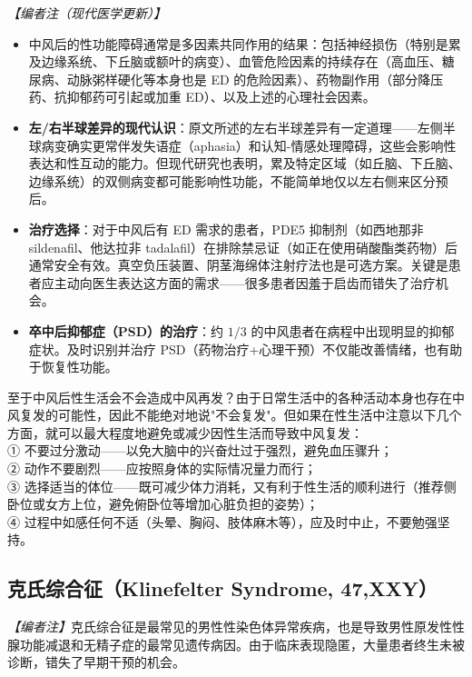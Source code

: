\noindent\textit{【编者注（现代医学更新）】}
\begin{itemize}
	\item 中风后的性功能障碍通常是多因素共同作用的结果：包括神经损伤（特别是累及边缘系统、下丘脑或额叶的病变）、血管危险因素的持续存在（高血压、糖尿病、动脉粥样硬化等本身也是 ED 的危险因素）、药物副作用（部分降压药、抗抑郁药可引起或加重 ED）、以及上述的心理社会因素。
	\item \textbf{左/右半球差异的现代认识}：原文所述的左右半球差异有一定道理——左侧半球病变确实更常伴发失语症（aphasia）和认知-情感处理障碍，这些会影响性表达和性互动的能力。但现代研究也表明，累及特定区域（如丘脑、下丘脑、边缘系统）的双侧病变都可能影响性功能，不能简单地仅以左右侧来区分预后。
	\item \textbf{治疗选择}：对于中风后有 ED 需求的患者，PDE5 抑制剂（如西地那非 sildenafil、他达拉非 tadalafil）在排除禁忌证（如正在使用硝酸酯类药物）后通常安全有效。真空负压装置、阴茎海绵体注射疗法也是可选方案。关键是患者应主动向医生表达这方面的需求——很多患者因羞于启齿而错失了治疗机会。
	\item \textbf{卒中后抑郁症（PSD）的治疗}：约 $1/3$ 的中风患者在病程中出现明显的抑郁症状。及时识别并治疗 PSD（药物治疗+心理干预）不仅能改善情绪，也有助于恢复性功能。
\end{itemize}

\begin{tcolorbox}[colback=pink!5!white,colframe=red!50!black,title=贴心小叮咛]
至于中风后性生活会不会造成中风再发？由于日常生活中的各种活动本身也存在中风复发的可能性，因此不能绝对地说"不会复发"。但如果在性生活中注意以下几个方面，就可以最大程度地避免或减少因性生活而导致中风复发：\\
① 不要过分激动——以免大脑中的兴奋灶过于强烈，避免血压骤升；\\
② 动作不要剧烈——应按照身体的实际情况量力而行；\\
③ 选择适当的体位——既可减少体力消耗，又有利于性生活的顺利进行（推荐侧卧位或女方上位，避免俯卧位等增加心脏负担的姿势）；\\
④ 过程中如感任何不适（头晕、胸闷、肢体麻木等），应及时中止，不要勉强坚持。
\end{tcolorbox}

\subsection{克氏综合征（Klinefelter Syndrome, 47,XXY）}

\noindent\textit{【编者注】}克氏综合征是最常见的男性性染色体异常疾病，也是导致男性原发性性腺功能减退和无精子症的最常见遗传病因。由于临床表现隐匿，大量患者终生未被诊断，错失了早期干预的机会。


